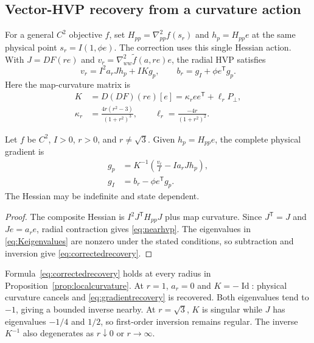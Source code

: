 \subsection{Vector-HVP recovery from a curvature action}
For a general $C^2$ objective $f$, set $H_{pp}=\nabla^2_{pp}f(s_r)$ and $h_p=H_{pp}e$ at the same physical point $s_r=I(1,\phi e)$. The correction uses this single Hessian action. With $J=DF(re)$ and $v_r=\nabla^2_{ww}\widetilde f(a,re)e$, the radial HVP satisfies
\begin{equation}
 v_r=I^2a_rJ h_p+IKg_p,\qquad
 b_r=g_I+\phi e^{\mathsf T}g_p.
 \label{eq:nearhvp}
\end{equation}
Here the map-curvature matrix is
\begin{equation}
 \begin{aligned}
 K&=D(DF)(re)[e]=\kappa_r ee^{\mathsf T}+\ell_rP_\perp,\\
 \kappa_r&=\frac{4r(r^2-3)}{(1+r^2)^3},\qquad
 \ell_r=\frac{-4r}{(1+r^2)^2}.
 \end{aligned}
 \label{eq:Keigenvalues}
\end{equation}
\begin{proposition}
\label{prop:localcurvature}
Let $f$ be $C^2$, $I>0$, $r>0$, and $r\ne\sqrt3$. Given $h_p=H_{pp}e$, the complete physical gradient is
\begin{equation}
 \begin{aligned}
 g_p&=K^{-1}\left(\frac{v_r}{I}-Ia_rJ h_p\right),\\
 g_I&=b_r-\phi e^{\mathsf T}g_p.
 \end{aligned}
 \label{eq:correctedrecovery}
\end{equation}
The Hessian may be indefinite and state dependent.
\end{proposition}
\begin{proof}
The composite Hessian is $I^2J^{\mathsf T}H_{pp}J$ plus map curvature. Since $J^{\mathsf T}=J$ and $Je=a_re$, radial contraction gives \eqref{eq:nearhvp}. The eigenvalues in \eqref{eq:Keigenvalues} are nonzero under the stated conditions, so subtraction and inversion give \eqref{eq:correctedrecovery}.
\end{proof}
Formula~\eqref{eq:correctedrecovery} holds at every radius in Proposition~\ref{prop:localcurvature}. At $r=1$, $a_r=0$ and $K=-\operatorname{Id}$: physical curvature cancels and \eqref{eq:gradientrecovery} is recovered. Both eigenvalues tend to $-1$, giving a bounded inverse nearby. At $r=\sqrt3$, $K$ is singular while $J$ has eigenvalues $-1/4$ and $1/2$, so first-order inversion remains regular. The inverse $K^{-1}$ also degenerates as $r\downarrow0$ or $r\to\infty$.

